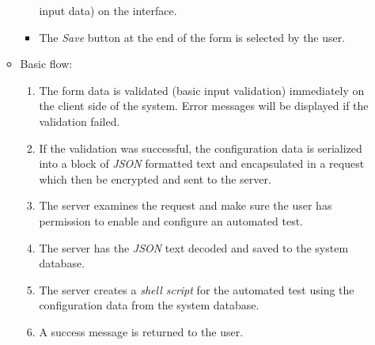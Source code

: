 \begin{enumerate}
\begin{itemize}
\begin{itemize}
                input data) on the
                interface.
            \item The \emph{Save} button at the end of the form is selected by
                the user.
        \end{itemize}
    \item Basic flow:
        \begin{enumerate}
            \item The form data is validated (basic input validation)
                immediately on the client side of the system. Error messages
                will be displayed if the validation failed.
            \item If the validation was successful, the configuration data is
                serialized into a block of \emph{JSON} \cite{JSON} formatted text and
                encapsulated in a request which then be encrypted and sent to
                the server.
            \item The server examines the request and make sure the user has
                permission to enable and configure an automated test.
            \item The server has the \emph{JSON} text decoded and saved to the
                system database.
            \item The server creates a \emph{shell script} \cite{shellScript}
                for the automated test using the configuration data from the
                system database.
            \item A success message is returned to the user.
        \end{enumerate}
\end{itemize}


\end{enumerate}
